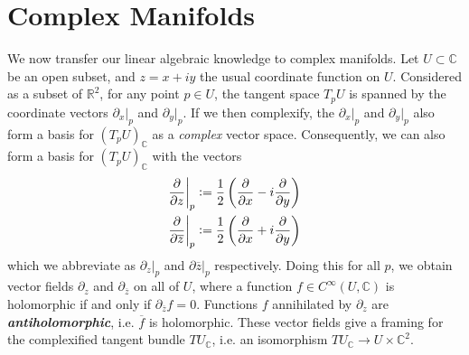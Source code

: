 \documentclass[psamsfonts, 12pt]{amsart}
\theoremstyle{definition}
\theoremstyle{remark}
\newcommand{\R}{\mathbb{R}}
\newcommand{\ib}[1]{\textbf{\textit{#1}}}
\newcommand{\C}{\mathbb{C}}
\newcommand{\defeq}{\vcentcolon=}
\begin{document}
\section{Complex Manifolds}
%
We now transfer our linear algebraic knowledge to complex manifolds. Let $U \subset \C$
be an open subset, and $z = x + iy$ the usual coordinate function on $U$. Considered
as a subset of $\R^2$, for any point $p \in U$, the tangent space $T_pU$ is spanned by
the coordinate vectors $\partial_x\vert_p$ and $\partial_y\vert_p$. If we then
complexify, the $\partial_x\vert_p$ and $\partial_y\vert_p$ also form a basis for
$(T_pU)_\C$ as a \emph{complex} vector space. Consequently, we can also form a
basis for $(T_pU)_\C$ with the vectors
%
\begin{align*}
\frac{\partial}{\partial z}\bigg\vert_p &\defeq
\frac{1}{2}\left(\frac{\partial}{\partial x} - i\frac{\partial}{\partial y}\right) \\
\frac{\partial}{\partial\overline{z}}\bigg\vert_p &\defeq
\frac{1}{2}\left( \frac{\partial}{\partial x} + i\frac{\partial}{\partial y}\right)
\end{align*}
%
which we abbreviate as $\partial_z\vert_p$ and $\partial{\overline{z}}\vert_p$
respectively. Doing this for all $p$, we obtain vector fields $\partial_z$ and
$\partial_{\overline{z}}$ on all of $U$, where a function $f \in C^\infty(U, \C)$ is
holomorphic if and only if $\partial_{\overline{z}}f = 0$. Functions $f$ annihilated by
$\partial_z$ are \ib{antiholomorphic}, i.e. $\overline{f}$ is holomorphic. These
vector fields give a framing for the complexified tangent bundle $TU_\C$, i.e. an
isomorphism $TU_\C \to U \times \C^2$. \\
\end{document}

